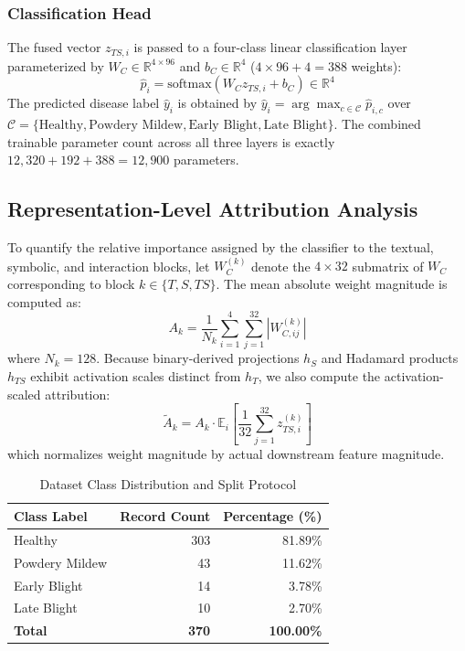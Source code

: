 \documentclass[conference]{IEEEtran}
\begin{document}
\subsubsection{Classification Head}
The fused vector $z_{TS,i}$ is passed to a four-class linear classification layer parameterized by $W_C \in \mathbb{R}^{4 \times 96}$ and $b_C \in \mathbb{R}^4$ ($4 \times 96 + 4 = 388$ weights):
\begin{equation}
\hat{p}_i = \text{softmax}(W_C z_{TS,i} + b_C) \in \mathbb{R}^4
\label{eq:softmax}
\end{equation}
The predicted disease label $\hat{y}_i$ is obtained by $\hat{y}_i = \arg\max_{c \in \mathcal{C}} \hat{p}_{i,c}$ over $\mathcal{C} = \{\text{Healthy}, \text{Powdery Mildew}, \text{Early Blight}, \text{Late Blight}\}$. The combined trainable parameter count across all three layers is exactly $12,320 + 192 + 388 = 12,900$ parameters.

\subsection{Representation-Level Attribution Analysis}
To quantify the relative importance assigned by the classifier to the textual, symbolic, and interaction blocks, let $W_C^{(k)}$ denote the $4 \times 32$ submatrix of $W_C$ corresponding to block $k \in \{T, S, TS\}$. The mean absolute weight magnitude is computed as:
\begin{equation}
A_k = \frac{1}{N_k} \sum_{i=1}^4 \sum_{j=1}^{32} \left| W_{C,ij}^{(k)} \right|
\label{eq:raw_attribution}
\end{equation}
where $N_k = 128$. Because binary-derived projections $h_S$ and Hadamard products $h_{TS}$ exhibit activation scales distinct from $h_T$, we also compute the activation-scaled attribution:
\begin{equation}
\tilde{A}_k = A_k \cdot \mathbb{E}_{i}\left[ \frac{1}{32} \sum_{j=1}^{32} z_{TS,i}^{(k)} \right]
\label{eq:scaled_attribution}
\end{equation}
which normalizes weight magnitude by actual downstream feature magnitude.

\begin{table}[t]
\caption{Dataset Class Distribution and Split Protocol}
\label{tab:dataset}
\centering
\begin{tabular}{lrr}
\toprule
\textbf{Class Label} & \textbf{Record Count} & \textbf{Percentage (\%)} \\
\midrule
Healthy & 303 & 81.89\% \\
Powdery Mildew & 43 & 11.62\% \\
Early Blight & 14 & 3.78\% \\
Late Blight & 10 & 2.70\% \\
\midrule
\textbf{Total} & \textbf{370} & \textbf{100.00\%} \\
\bottomrule
\end{tabular}
\end{table}
\end{document}
